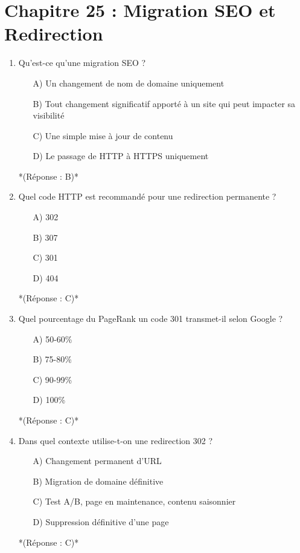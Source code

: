 \documentclass[12pt,a4paper,twoside]{report}
\begin{document}
\section*{Chapitre 25 : Migration SEO et Redirection}

\begin{enumerate}
\item Qu'est-ce qu'une migration SEO ?
\begin{itemize}
\item[A)] Un changement de nom de domaine uniquement
\item[B)] Tout changement significatif apporté à un site qui peut impacter sa visibilité
\item[C)] Une simple mise à jour de contenu
\item[D)] Le passage de HTTP à HTTPS uniquement
\end{itemize}
*(Réponse : B)*

\item Quel code HTTP est recommandé pour une redirection permanente ?
\begin{itemize}
\item[A)] 302
\item[B)] 307
\item[C)] 301
\item[D)] 404
\end{itemize}
*(Réponse : C)*

\item Quel pourcentage du PageRank un code 301 transmet-il selon Google ?
\begin{itemize}
\item[A)] 50-60\%
\item[B)] 75-80\%
\item[C)] 90-99\%
\item[D)] 100\%
\end{itemize}
*(Réponse : C)*

\item Dans quel contexte utilise-t-on une redirection 302 ?
\begin{itemize}
\item[A)] Changement permanent d'URL
\item[B)] Migration de domaine définitive
\item[C)] Test A/B, page en maintenance, contenu saisonnier
\item[D)] Suppression définitive d'une page
\end{itemize}
*(Réponse : C)*


\end{enumerate}
\end{document}
